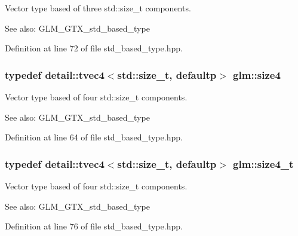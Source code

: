 Vector type based of three std::size\_\-t components. \begin{Desc}
\item[See also:]GLM\_\-GTX\_\-std\_\-based\_\-type \end{Desc}


Definition at line 72 of file std\_\-based\_\-type.hpp.\hypertarget{group__gtx__std__based__type_gc04a40cfe44b5035770cf26d98a9349d}{
\subsubsection[size4]{\setlength{\rightskip}{0pt plus 5cm}typedef detail::tvec4$<$std::size\_\-t, defaultp$>$ {\bf glm::size4}}}
\label{group__gtx__std__based__type_gc04a40cfe44b5035770cf26d98a9349d}


Vector type based of four std::size\_\-t components. \begin{Desc}
\item[See also:]GLM\_\-GTX\_\-std\_\-based\_\-type \end{Desc}


Definition at line 64 of file std\_\-based\_\-type.hpp.\hypertarget{group__gtx__std__based__type_gaaf9b6a73135945e356601a01beece30}{
\subsubsection[size4\_\-t]{\setlength{\rightskip}{0pt plus 5cm}typedef detail::tvec4$<$std::size\_\-t, defaultp$>$ {\bf glm::size4\_\-t}}}
\label{group__gtx__std__based__type_gaaf9b6a73135945e356601a01beece30}


Vector type based of four std::size\_\-t components. \begin{Desc}
\item[See also:]GLM\_\-GTX\_\-std\_\-based\_\-type \end{Desc}


Definition at line 76 of file std\_\-based\_\-type.hpp.